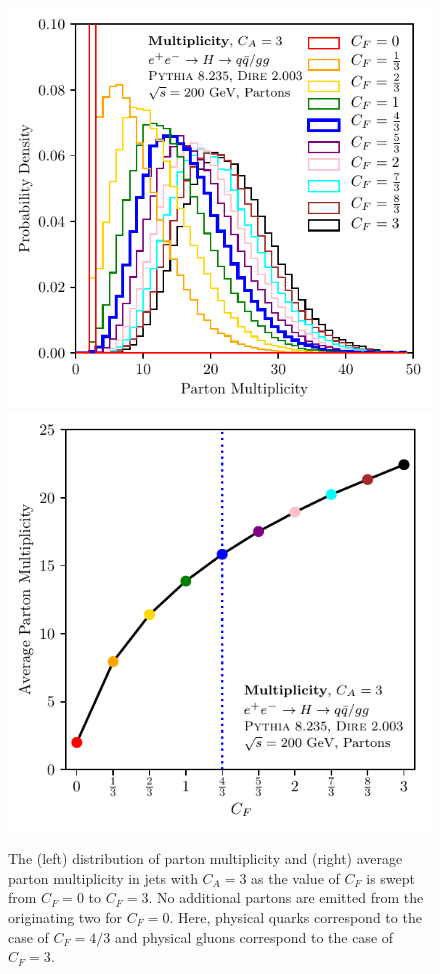 \documentclass[letterpaper,11pt]{article}
\begin{document}
\begin{figure}[t]
\centering
\includegraphics[scale=0.75]{figures/multdist.pdf}
\includegraphics[scale=0.75]{figures/multmean.pdf}
\caption{\label{fig:multdist}
The (left) distribution of parton multiplicity and (right) average parton multiplicity in jets with $C_A=3$ as the value of $C_F$ is swept from $C_F=0$ to $C_F=3$.
%
No additional partons are emitted from the originating two for $C_F=0$.
%
Here, physical quarks correspond to the case of $C_F=4/3$ and physical gluons correspond to the case of $C_F=3$.
}
\end{figure}
\end{document}
